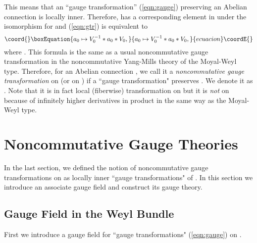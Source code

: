 \documentclass[10pt,a4paper]{article}
\def\h{\hbar}
\def\hA{{\hat A}}
\begin{document}
This means that an ``gauge transformation'' \coordHE{} (\ref{eqn:gauge}) preserving an Abelian connection is locally inner. Therefore, \coordHE{} has a corresponding element in \myHighlight{$(C^\infty(M)[[\h]]\otimes {\cal A},*)$}\coordHE{} under the isomorphism \myHighlight{$\sigma$}\coordHE{} for \coordHE{} and (\ref{eqn:gtr}) is equivalent to
\begin{equation}\coord{}\boxEquation{
\label{eqn:gstar}
a_0\mapsto V_0^{-1}*a_0*V_0,
}{
a_0\mapsto V_0^{-1}*a_0*V_0,
}{ecuacion}\coordE{}\end{equation}
where \coordHE{}. This formula is the same as a usual noncommutative gauge transformation in the noncommutative Yang-Mills theory of the Moyal-Weyl type. Therefore, for an Abelian connection \coordHE{}, we call it a {\it noncommutative gauge transformation} on \coordHE{} (or on \myHighlight{$(C^\infty(M)[[\h]]\otimes {\cal A},*)$}\coordHE{} ) if a ``gauge transformation" \coordHE{} preserves \coordHE{}. We denote it as \coordHE{}. Note that it is in fact local (fiberwise) transformation on \coordHE{} but it is {\it not} on \myHighlight{$(C^\infty(M)[[\h]]\otimes {\cal A},*)$}\coordHE{} because of infinitely higher derivatives in \myHighlight{$*$}\coordHE{} product in the same way as the Moyal-Weyl type.\\



\section{Noncommutative Gauge Theories}
\label{sec:ncgf}

In the last section, we defined the notion of noncommutative gauge transformations on \coordHE{} as locally inner ``gauge transformations" of \coordHE{}. In this section we introduce an associate gauge field and construct its gauge theory. \\


\subsection{Gauge Field in the Weyl Bundle
\label{sec:gfiw}}

First we introduce a gauge field \myHighlight{$\hA$}\coordHE{} for ``gauge transformations" (\ref{eqn:gauge}) on \coordHE{}.\\
\end{document}
